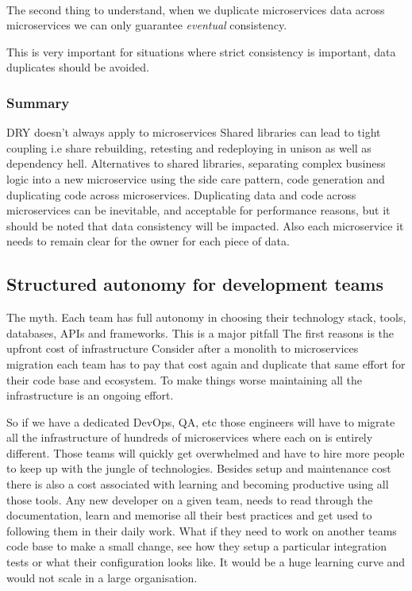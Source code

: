\paragraph{}
The second thing to understand, when we duplicate microservices data across microservices we can only guarantee \textit{eventual} consistency.

\begin{note}
    This is very important for situations where strict consistency is important, data duplicates should be avoided.
\end{note}

\subsubsection{Summary}
DRY doesn't always apply to microservices
Shared libraries can lead to tight coupling i.e share rebuilding, retesting and redeploying in unison as well as dependency hell.
Alternatives to shared libraries, separating complex business logic into a new microservice using the side care pattern, code generation and duplicating code across microservices.
Duplicating data and code across microservices can be inevitable, and acceptable for performance reasons, but it should be noted that data consistency will be impacted.
Also each microservice it needs to remain clear for the owner for each piece of data.

\subsection{Structured autonomy for development teams}
The myth.
Each team has full autonomy in choosing their technology stack, tools, databases, APIs and frameworks.
This is a major pitfall
The first reasons is the upfront cost of infrastructure
Consider after a monolith to microservices migration each team has to pay that cost again and duplicate that same effort for their code base and ecosystem.
To make things worse maintaining all the infrastructure is an ongoing effort.

So if we have a dedicated DevOps, QA, etc those engineers will have to migrate all the infrastructure of hundreds of microservices where each on is entirely different.
Those teams will quickly get overwhelmed and have to hire more people to keep up with the jungle of technologies.
Besides setup and maintenance cost there is also a cost associated with learning and becoming productive using all those tools.
Any new developer on a given team, needs to read through the documentation, learn and memorise all their best practices and get used to following them in their daily work.
What if they need to work on another teams code base to make a small change, see how they setup a particular integration tests or what their configuration looks like.
It would be a huge learning curve and would not scale in a large organisation.

